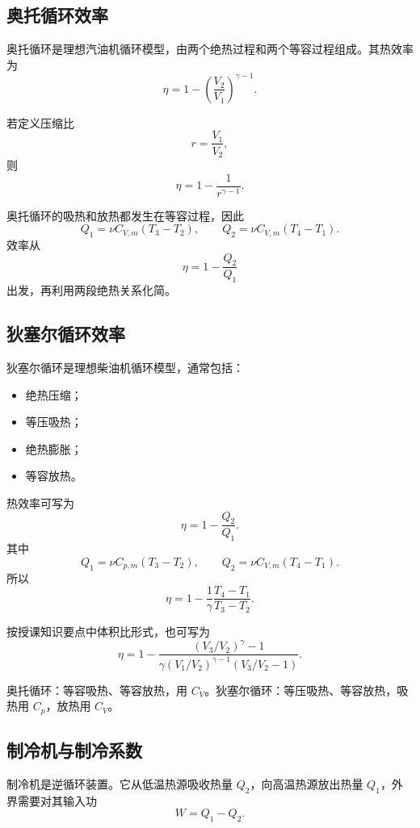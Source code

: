 \subsection{奥托循环效率}

奥托循环是理想汽油机循环模型，由两个绝热过程和两个等容过程组成。其热效率为
\[
  \boxed{
  \eta
  =
  1-\left(\frac{V_2}{V_1}\right)^{\gamma-1}
  }.
\]

若定义压缩比
\[
  r=\frac{V_1}{V_2},
\]
则
\[
  \boxed{
  \eta=1-\frac{1}{r^{\gamma-1}}
  }.
\]

\begin{KeyBox}[奥托循环记忆法]
奥托循环的吸热和放热都发生在等容过程，因此
\[
  Q_1=\nu C_{V,m}(T_3-T_2),
  \qquad
  Q_2=\nu C_{V,m}(T_4-T_1).
\]
效率从
\[
  \eta=1-\frac{Q_2}{Q_1}
\]
出发，再利用两段绝热关系化简。
\end{KeyBox}

\subsection{狄塞尔循环效率}

狄塞尔循环是理想柴油机循环模型，通常包括：
\begin{itemize}
  \item 绝热压缩；
  \item 等压吸热；
  \item 绝热膨胀；
  \item 等容放热。
\end{itemize}

热效率可写为
\[
  \eta
  =
  1-\frac{Q_2}{Q_1}.
\]
其中
\[
  Q_1=\nu C_{p,m}(T_3-T_2),
  \qquad
  Q_2=\nu C_{V,m}(T_4-T_1).
\]
所以
\[
  \boxed{
  \eta
  =
  1-\frac{1}{\gamma}\frac{T_4-T_1}{T_3-T_2}
  }.
\]

按授课知识要点中体积比形式，也可写为
\[
  \boxed{
  \eta
  =
  1-
  \frac{(V_3/V_2)^\gamma-1}
  {\gamma (V_1/V_2)^{\gamma-1}(V_3/V_2-1)}
  }.
\]

\begin{WarnBox}[奥托与狄塞尔不要混]
奥托循环：等容吸热、等容放热，用 \(C_V\)。狄塞尔循环：等压吸热、等容放热，吸热用 \(C_p\)，放热用 \(C_V\)。
\end{WarnBox}

\subsection{制冷机与制冷系数}

制冷机是逆循环装置。它从低温热源吸收热量 \(Q_2\)，向高温热源放出热量 \(Q_1\)，外界需要对其输入功
\[
  W=Q_1-Q_2.
\]

